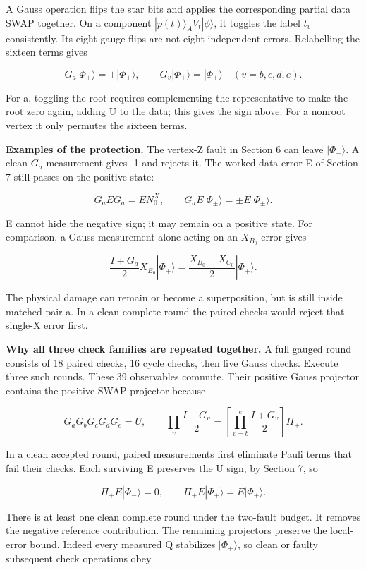 \documentclass[11pt]{article}
\begin{document}
A Gauss operation flips the star bits and applies the corresponding partial data SWAP together. On a component \(|p(t)\rangle_A V_t|\phi\rangle\), it toggles the label \(t_v\) consistently. Its eight gauge flips are not eight independent errors. Relabelling the sixteen terms gives

\[
G_a|\Phi_\pm\rangle=\pm|\Phi_\pm\rangle,\qquad
G_v|\Phi_\pm\rangle=|\Phi_\pm\rangle\quad(v=b,c,d,e).
\]

For a, toggling the root requires complementing the representative to make the root zero again, adding U to the data; this gives the sign above. For a nonroot vertex it only permutes the sixteen terms.

\textbf{Examples of the protection.} The vertex-Z fault in Section 6 can leave \(|\Phi_-\rangle\). A clean \(G_a\) measurement gives -1 and rejects it. The worked data error E of Section 7 still passes on the positive state:

\[
G_aEG_a=E N_0^X,\qquad
G_aE|\Phi_\pm\rangle=\pm E|\Phi_\pm\rangle.
\]

E cannot hide the negative sign; it may remain on a positive state. For comparison, a Gauss measurement alone acting on an \(X_{B_0}\) error gives

\[
\frac{I+G_a}{2}X_{B_0}|\Phi_+\rangle
=\frac{X_{B_0}+X_{C_0}}2|\Phi_+\rangle.
\]

The physical damage can remain or become a superposition, but is still inside matched pair a. In a clean complete round the paired checks would reject that single-X error first.

\textbf{Why all three check families are repeated together.} A full gauged round consists of 18 paired checks, 16 cycle checks, then five Gauss checks. Execute three such rounds. These 39 observables commute. Their positive Gauss projector contains the positive SWAP projector because

\[
G_aG_bG_cG_dG_e=U,\qquad
\prod_v\frac{I+G_v}{2}=\left[\prod_{v=b}^e\frac{I+G_v}{2}\right]\Pi_+.
\]

In a clean accepted round, paired measurements first eliminate Pauli terms that fail their checks. Each surviving E preserves the U sign, by Section 7, so

\[
\Pi_+E|\Phi_-\rangle=0,\qquad
\Pi_+E|\Phi_+\rangle=E|\Phi_+\rangle.
\]

There is at least one clean complete round under the two-fault budget. It removes the negative reference contribution. The remaining projectors preserve the local-error bound. Indeed every measured Q stabilizes \(|\Phi_+\rangle\), so clean or faulty subsequent check operations obey
\end{document}
